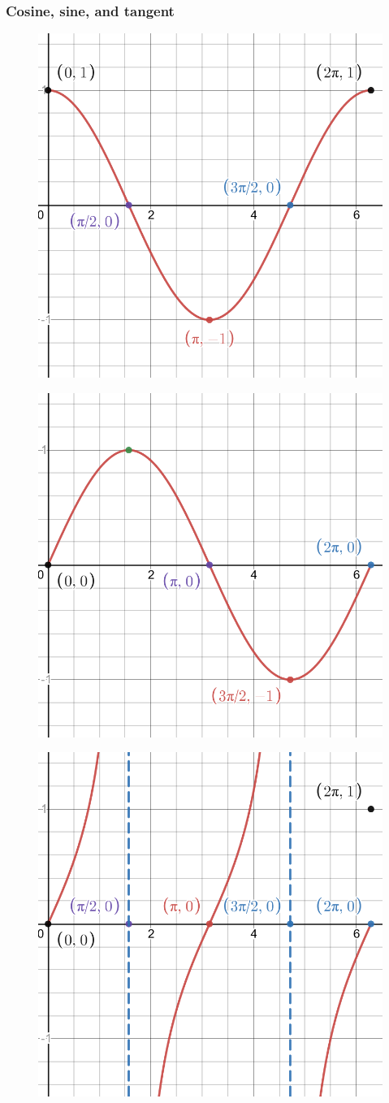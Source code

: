 \documentclass[letterpaper,9pt,fleqn]{extarticle}
\begin{document}
\subsubsection*{Cosine, sine, and tangent}
\vspace{-0.2in}
\begin{figure}[h]
\centering
\begin{minipage}{.333\textwidth}
  \centering
  \includegraphics[width=.25\linewidth]{desmos-graph-cos}
  \label{fig:test1}
\end{minipage}%
\begin{minipage}{.333\textwidth}
  \centering
  \includegraphics[width=.25\linewidth]{desmos-graph-sine}
  \label{fig:test2}
\end{minipage}%
\begin{minipage}{.333\textwidth}
  \centering
  \includegraphics[width=.25\linewidth]{desmos-graph-tan}
  \label{fig:test2}
\end{minipage}
\end{figure}
\vspace{-0.2in}
\end{document}
